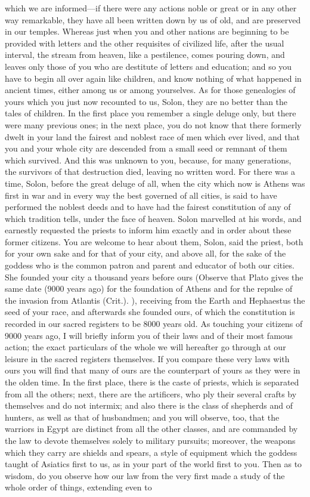 \documentclass[11pt,letter]{article}
\begin{document}
which we are informed—if there were any actions noble or great or in any other way remarkable, they have all been written down by us of old, and are preserved in our temples. Whereas just when you and other nations are beginning to be provided with letters and the other requisites of civilized life, after the usual interval, the stream from heaven, like a pestilence, comes pouring down, and leaves only those of you who are destitute of letters and education; and so you have to begin all over again like children, and know nothing of what happened in ancient times, either among us or among yourselves. As for those genealogies of yours which you just now recounted to us, Solon, they are no better than the tales of children. In the first place you remember a single deluge only, but there were many previous ones; in the next place, you do not know that there formerly dwelt in your land the fairest and noblest race of men which ever lived, and that you and your whole city are descended from a small seed or remnant of them which survived. And this was unknown to you, because, for many generations, the survivors of that destruction died, leaving no written word. For there was a time, Solon, before the great deluge of all, when the city which now is Athens was first in war and in every way the best governed of all cities, is said to have performed the noblest deeds and to have had the fairest constitution of any of which tradition tells, under the face of heaven. Solon marvelled at his words, and earnestly requested the priests to inform him exactly and in order about these former citizens. You are welcome to hear about them, Solon, said the priest, both for your own sake and for that of your city, and above all, for the sake of the goddess who is the common patron and parent and educator of both our cities. She founded your city a thousand years before ours (Observe that Plato gives the same date (9000 years ago) for the foundation of Athens and for the repulse of the invasion from Atlantis (Crit.). ), receiving from the Earth and Hephaestus the seed of your race, and afterwards she founded ours, of which the constitution is recorded in our sacred registers to be 8000 years old. As touching your citizens of 9000 years ago, I will briefly inform you of their laws and of their most famous action; the exact particulars of the whole we will hereafter go through at our leisure in the sacred registers themselves. If you compare these very laws with ours you will find that many of ours are the counterpart of yours as they were in the olden time. In the first place, there is the caste of priests, which is separated from all the others; next, there are the artificers, who ply their several crafts by themselves and do not intermix; and also there is the class of shepherds and of hunters, as well as that of husbandmen; and you will observe, too, that the warriors in Egypt are distinct from all the other classes, and are commanded by the law to devote themselves solely to military pursuits; moreover, the weapons which they carry are shields and spears, a style of equipment which the goddess taught of Asiatics first to us, as in your part of the world first to you. Then as to wisdom, do you observe how our law from the very first made a study of the whole order of things, extending even to 
\end{document}
